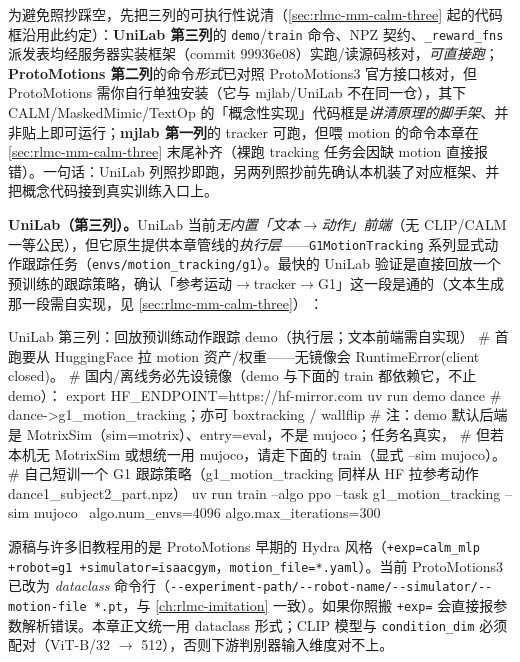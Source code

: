 \begin{note}
为避免照抄踩空，先把三列的可执行性说清（\cref{sec:rlmc-mm-calm-three} 起的代码框沿用此约定）：\textbf{UniLab 第三列}的 \texttt{demo}/\texttt{train} 命令、NPZ 契约、\texttt{\_reward\_fns} 派发表均经服务器实装框架（commit 99936e08）实跑/读源码核对，\emph{可直接跑}；\textbf{ProtoMotions 第二列}的命令\emph{形式}已对照 ProtoMotions3 官方接口核对，但 ProtoMotions 需你自行单独安装（它与 mjlab/UniLab 不在同一仓），其下 CALM/MaskedMimic/TextOp 的「概念性实现」代码框是\emph{讲清原理的脚手架}、并非贴上即可运行；\textbf{mjlab 第一列}的 tracker 可跑，但喂 motion 的命令本章在 \cref{sec:rlmc-mm-calm-three} 末尾补齐（裸跑 tracking 任务会因缺 motion 直接报错）。一句话：UniLab 列照抄即跑，另两列照抄前先确认本机装了对应框架、并把概念代码接到真实训练入口上。
\end{note}

\textbf{UniLab（第三列）。}UniLab 当前\emph{无内置「文本$\to$动作」前端}（无 CLIP/CALM 一等公民），但它原生提供本章管线的\emph{执行层}——\texttt{G1MotionTracking} 系列显式动作跟踪任务（\verb|envs/motion_tracking/g1|）。最快的 UniLab 验证是直接回放一个预训练的跟踪策略，确认「参考运动$\to$tracker$\to$G1」这一段是通的（文本生成那一段需自实现，见 \cref{sec:rlmc-mm-calm-three}）\,\cite{unilab2026}：

\begin{codebox}[bash]{UniLab 第三列：回放预训练动作跟踪 demo（执行层；文本前端需自实现）}
# 首跑要从 HuggingFace 拉 motion 资产/权重——无镜像会 RuntimeError(client closed)。
# 国内/离线务必先设镜像（demo 与下面的 train 都依赖它，不止 demo）：
export HF_ENDPOINT=https://hf-mirror.com
uv run demo dance            # dance->g1_motion_tracking；亦可 boxtracking / wallflip
# 注：demo 默认后端是 MotrixSim（sim=motrix）、entry=eval，不是 mujoco；任务名真实，
#     但若本机无 MotrixSim 或想统一用 mujoco，请走下面的 train（显式 --sim mujoco）。
# 自己短训一个 G1 跟踪策略（g1_motion_tracking 同样从 HF 拉参考动作 dance1_subject2_part.npz）
uv run train --algo ppo --task g1_motion_tracking --sim mujoco \
    algo.num_envs=4096 algo.max_iterations=300
\end{codebox}

\begin{note}
源稿与许多旧教程用的是 ProtoMotions 早期的 Hydra 风格（\verb|+exp=calm_mlp +robot=g1 +simulator=isaacgym|，\verb|motion_file=*.yaml|）。当前 ProtoMotions3 已改为 \emph{dataclass} 命令行（\verb|--experiment-path/--robot-name/--simulator/--motion-file *.pt|，与 \cref{ch:rlmc-imitation} 一致）。如果你照搬 \verb|+exp=| 会直接报参数解析错误。本章正文统一用 dataclass 形式；CLIP 模型与 \verb|condition_dim| 必须配对（ViT-B/32 $\to$ 512），否则下游判别器输入维度对不上。
\end{note}


